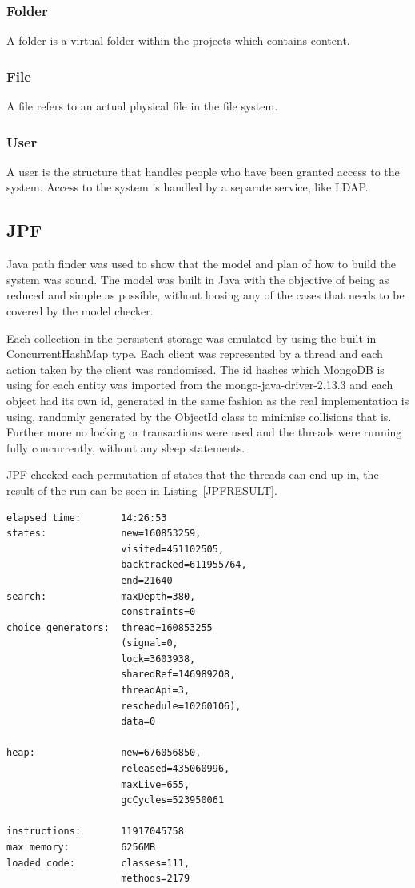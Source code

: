 \documentclass[a4paper,12pt]{article}
\begin{document}
\subsubsection{Folder}
A folder is a virtual folder within the projects which contains content.

\subsubsection{File}
A file refers to an actual physical file in the file system.

\subsubsection{User}
A user is the structure that handles people who have been granted access to the system.
Access to the system is handled by a separate service, like LDAP.

\subsection{JPF}
Java path finder was used to show that the model and plan of how to build the system was sound. The model was built in Java 
with the objective of being as reduced and simple as possible, without loosing any of the cases that needs to be covered 
by the model checker.

Each collection in the persistent storage was emulated by using the built-in ConcurrentHashMap type. 
Each client was represented by a thread and each action taken by the client was randomised. The id hashes which MongoDB is 
using for each entity was imported from the mongo-java-driver-2.13.3 and each object had its own id, generated in the same 
fashion as the real implementation is using, randomly generated by the ObjectId class to minimise collisions that is. 
Further more no locking or transactions were used and the threads were running fully concurrently, without any sleep statements. 

JPF checked each permutation of states that the threads can end up in, the result of the run can be seen in Listing~\ref{JPFRESULT}.

\begin{lstlisting}[label=JPFRESULT,caption=Results of JPF run]
elapsed time:       14:26:53
states:             new=160853259,
                    visited=451102505,
                    backtracked=611955764,
                    end=21640
search:             maxDepth=380,
                    constraints=0
choice generators:  thread=160853255 
                    (signal=0,
                    lock=3603938,
                    sharedRef=146989208,
                    threadApi=3,
                    reschedule=10260106), 
                    data=0

heap:               new=676056850,
                    released=435060996,
                    maxLive=655,
                    gcCycles=523950061

instructions:       11917045758
max memory:         6256MB
loaded code:        classes=111,
                    methods=2179
\end{lstlisting}
\end{document}
